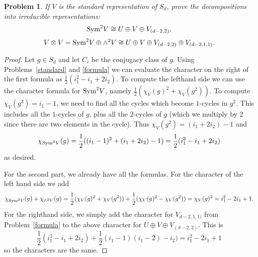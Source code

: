 \documentclass{article}
\newcommand{\sym}{\textup{Sym}}
\newtheorem{problem}{Problem}
\begin{document}
\begin{problem}
If $V$ is the standard representation of $S_d$, prove the decompositions into irreducible representations:
\[
\sym^2 V \cong U \oplus V \oplus V_{(d-2,2)},
\]
\[
V \otimes V = \sym^2 V \oplus \wedge^2 V \cong U \oplus V \oplus V_{(d-2,2)} \oplus V_{(d-2,1,1)}.
\]
\end{problem}
\begin{proof}
Let $g \in S_d$ and let $C_i$ be the conjugacy class of $g$. Using Problems~\ref{standard} and \ref{formula} we can evaluate the character on the right of the first formula as $\frac{1}{2}(i_1^2 - i_1 + 2i_2)$. To compute the lefthand side we can use the character formula for $\sym^2V$, namely $\frac{1}{2}(\chi_V(g)^2 + \chi_V(g^2))$. To compute $\chi_V(g^2) = i_1 - 1$, we need to find all the cycles which become $1$-cycles in $g^2$. This includes all the $1$-cycles of $g$, plus all the $2$-cycles of $g$ (which we multiply by $2$ since there are two elements in the cycle). Thus $\chi_V(g^2) = (i_1 + 2i_2) - 1$ and
\[
\chi_{\sym^2V}(g) = \frac{1}{2}((i_1 - 1)^2 + (i_1 + 2i_2) - 1) = \frac{1}{2}(i_1^2 - i_1 + 2i_2)
\]
as desired.

For the second part, we already have all the formulas. For the character of the left hand side we add
\[
\chi_{\sym^2V}(g) + \chi_{\wedge^2 V}(g) = \frac{1}{2}(\chi_V(g)^2 + \chi_V(g^2)) + \frac{1}{2}(\chi_V(g)^2 - \chi_V(g^2)) = \chi_V(g)^2 = i_1^2 - 2i_1 + 1.
\]
For the righthand side, we simply add the character for $V_{d-2,1,1)}$ from Problem~\ref{formula} to the above character for $U \oplus V \oplus V_{(d-2,2)}$. This is
\[
\frac{1}{2}(i_1^2 - i_1 + 2i_2) + \frac{1}{2}(i_1-1)(i_1-2) - i_2) = i_1^2 - 2i_1 + 1
\]
so the characters are the same.
\end{proof}
\end{document}
